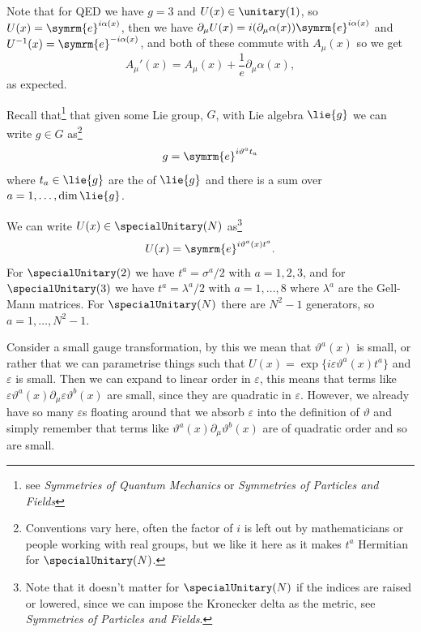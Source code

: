 \documentclass[fleqn]{NotesClass}
\newcommand*{\course}[1]{\textit{#1}}
\newcommand{\e}{\symrm{e}}
\begin{document}
    Note that for QED we have \(g = 3\) and \(U(x) \in \unitary(1)\), so \(U(x) = \e^{i\alpha(x)}\), then we have \(\partial_\mu U(x) = i(\partial_\mu\alpha(x))\e^{i\alpha(x)}\) and \(U^{-1}(x) = \e^{-i\alpha(x)}\), and both of these commute with \(A_\mu(x)\) so we get
    \begin{equation}
        A_\mu'(x) = A_\mu(x) + \frac{1}{e}\partial_\mu \alpha(x),
    \end{equation}
    as expected.
    
    Recall that\footnote{see \course{Symmetries of Quantum Mechanics} or \course{Symmetries of Particles and Fields}} that given some Lie group, \(G\), with Lie algebra \(\lie{g}\) we can write \(g \in G\) as\footnote{Conventions vary here, often the factor of \(i\) is left out by mathematicians or people working with real groups, but we like it here as it makes \(t^a\) Hermitian for \(\specialUnitary(N)\).}
    \begin{equation}
        g = \e^{i\vartheta^at_a}
    \end{equation}
    where \(t_a \in \lie{g}\) are the  of \(\lie{g}\) and there is a sum over \(a = 1, \dotsc, \dim \lie{g}\).
    
    We can write \(U(x) \in \specialUnitary(N)\) as\footnote{Note that it doesn't matter for \(\specialUnitary(N)\) if the indices are raised or lowered, since we can impose the Kronecker delta as the metric, see \course{Symmetries of Particles and Fields}.}
    \begin{equation}
        U(x) = \e^{i\vartheta^a(x)t^a}.
    \end{equation}
    For \(\specialUnitary(2)\) we have \(t^a = \sigma^a/2\) with \(a = 1, 2, 3\), and for \(\specialUnitary(3)\) we have \(t^a = \lambda^a/2\) with \(a = 1, \dotsc, 8\) where \(\lambda^a\) are the Gell-Mann matrices.
    For \(\specialUnitary(N)\) there are \(N^2 - 1\) generators, so \(a = 1, \dotsc, N^2 - 1\).
    
    Consider a small gauge transformation, by this we mean that \(\vartheta^a(x)\) is small, or rather that we can parametrise things such that \(U(x) = \exp\{i\varepsilon\vartheta^a(x)t^a\}\) and \(\varepsilon\) is small.
    Then we can expand to linear order in \(\varepsilon\), this means that terms like \(\varepsilon\vartheta^a(x)\partial_\mu \varepsilon\vartheta^b(x)\) are small, since they are quadratic in \(\varepsilon\).
    However, we already have so many \(\varepsilon\)s floating around that we absorb \(\varepsilon\) into the definition of \(\vartheta\) and simply remember that terms like \(\vartheta^a(x)\partial_\mu\vartheta^b(x)\) are of quadratic order and so are small.
    
\end{document}
